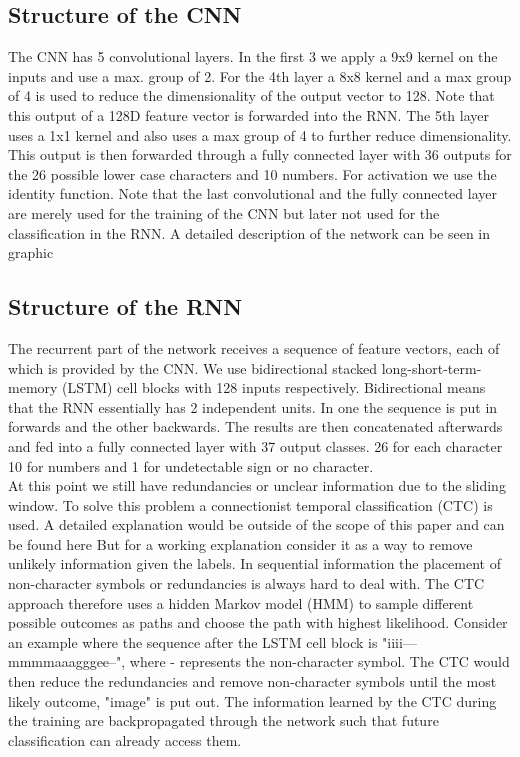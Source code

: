\documentclass{utue} %
\begin{document}
\subsection{Structure of the CNN}
The CNN has 5 convolutional layers. In the first 3 we apply a 9x9 kernel on the inputs and use a max. group of 2. For the 4th layer a 8x8 kernel and a max group of 4 is used to reduce the dimensionality of the output vector to 128. Note that this output of a 128D feature vector is forwarded into the RNN. The 5th layer uses a 1x1 kernel %
and also uses a max group of 4 to further reduce dimensionality. This output is then forwarded through a fully connected layer with 36 outputs for the 26 possible lower case characters and 10 numbers. For activation we use the identity function. Note that the last convolutional and the fully connected layer are merely used for the training of the CNN but later not used for the classification in the RNN. A detailed description of the network can be seen in graphic %

\subsection{Structure of the RNN}
The recurrent part of the network receives a sequence of feature vectors, each of which is provided by the CNN. We use bidirectional stacked long-short-term-memory (LSTM) cell blocks with 128 inputs respectively. Bidirectional means that the RNN essentially has 2 independent units. In one the sequence is put in forwards and the other backwards. The results are then concatenated afterwards and fed into a fully connected layer with 37 output classes. 26 for each character 10 for numbers and 1 for undetectable sign or no character. \\
At this point we still have redundancies or unclear information due to the sliding window. To solve this problem a connectionist temporal classification (CTC) is used. A detailed explanation would be outside of the scope of this paper and can be found here %
But for a working explanation consider it as a way to remove unlikely information given the labels. In sequential information the placement of non-character symbols or redundancies is always hard to deal with. The CTC approach therefore uses a hidden Markov model (HMM) to sample different possible outcomes as paths and choose the path with highest likelihood. Consider an example where the sequence after the LSTM cell block is "iiii---mmmmaaagggee--", where - represents the non-character symbol. The CTC would then reduce the redundancies and remove non-character symbols until the most likely outcome, "image" is put out. The information learned by the CTC during the training are backpropagated through the network such that future classification can already access them. 
\end{document}
